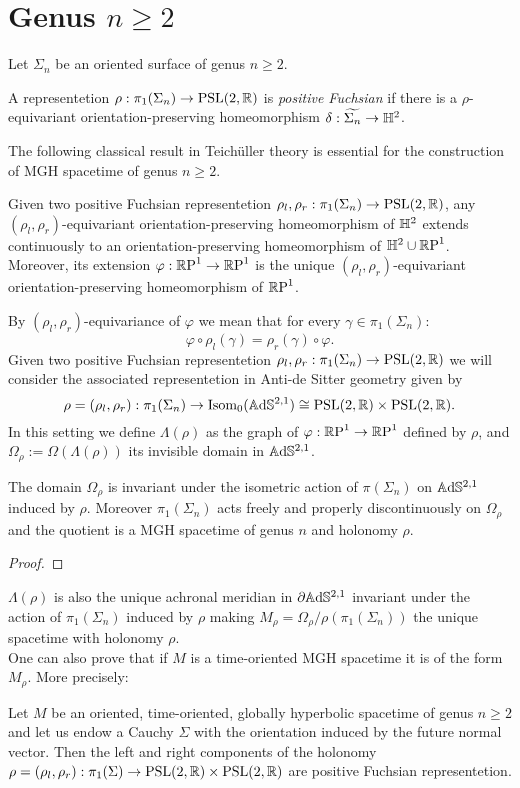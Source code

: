 \section{Genus $n\geq 2$}
Let $\Sigma_n$ be an oriented surface of genus $n\geq 2$.
\begin{definition}
    A representetion $\rho: \pi_1(\Sigma_n) \to \PSL$ is \textit{positive Fuchsian} if there is a $\rho$-equivariant orientation-preserving homeomorphism $\delta : \widetilde{\Sigma_n}\to\H^2$.
\end{definition}
The following classical result in Teich\"uller theory is essential for the construction of MGH spacetime of genus $n\geq 2$.
\begin{lemma}
    Given two positive Fuchsian representetion $\rho_l, \rho_r : \pi_1(\Sigma_n) \to \PSL$, any $(\rho_l, \rho_r)$-equivariant orientation-preserving homeomorphism of $\H^2$ extends continuously to an orientation-preserving homeomorphism of $\H^2\cup\S$. Moreover, its extension $\varphi : \S\to\S$ is the unique $(\rho_l, \rho_r)$-equivariant orientation-preserving homeomorphism of $\S$.
\end{lemma}
By $(\rho_l, \rho_r)$-equivariance of $\varphi$ we mean that for every $\gamma \in \pi_1(\Sigma_n)$:
\[
    \varphi \circ \rho_l(\gamma) = \rho_r(\gamma)\circ\varphi.
\]
Given two positive Fuchsian representetion $\rho_l, \rho_r : \pi_1(\Sigma_n) \to \PSL$ we will consider the associated representetion in Anti-de Sitter geometry given by
\[
    \rho = (\rho_l, \rho_r) : \pi_1(\Sigma_n) \to \text{Isom}_0(\A^{2,1}) \cong \PSL \times \PSL.
\]
In this setting we define $\Lambda(\rho)$ as the graph of $\varphi: \S\to\S$ defined by $\rho$, and $\Omega_\rho := \Omega(\Lambda(\rho))$ its invisible domain in $\A^{2,1}$.
\begin{proposition}
    The domain $\Omega_\rho$ is invariant under the isometric action of $\pi(\Sigma_n)$ on $\A^{2,1}$ induced by $\rho$. Moreover $\pi_1(\Sigma_n)$ acts freely and properly discontinuously on $\Omega_\rho$ and the quotient is a MGH spacetime of genus $n$ and holonomy $\rho$.
\end{proposition}
\begin{proof}
\end{proof}
$\Lambda(\rho)$ is also the unique achronal meridian in $\partial\A^{2,1}$ invariant under the action of $\pi_1(\Sigma_n)$ induced by $\rho$ making $M_\rho = \Omega_\rho / \rho(\pi_1(\Sigma_n))$ the unique spacetime with holonomy $\rho$.\\
One can also prove that if $M$ is a time-oriented MGH spacetime it is of the form $M_\rho$. More precisely:
\begin{proposition}
    Let $M$ be an oriented, time-oriented, globally hyperbolic spacetime of genus $n\geq 2$ and let us endow a Cauchy $\Sigma$ with the orientation induced by the future normal vector. Then the left and right components of the holonomy $\rho=(\rho_l,\rho_r): \pi_1(\Sigma)\to\PSL\times\PSL$ are positive Fuchsian representetion.
\end{proposition}

